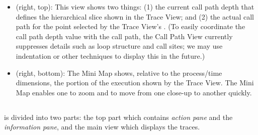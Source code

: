 \begin{itemize}
\item \textbf{\callview} (right, top):
  This view shows two things: (1) the current call path depth that defines the hierarchical slice shown in the Trace View; and (2) the actual call path for the point selected by the Trace View's \crosshair{}.
  (To easily coordinate the call path depth value with the call path, the Call Path View currently suppresses details such as loop structure and call sites; we may use indentation or other techniques to display this in the future.)

\item \textbf{\miniview} (right, bottom):
  The Mini Map shows, relative to the process/time dimensions, the portion of the execution shown by the Trace View.
  The Mini Map enables one to zoom and to move from one close-up to another quickly.

\end{itemize}


\subsection{\traceview}
\label{sec:traceview}

\traceview{} is divided into two parts: the top part which contains \emph{action pane} and the \emph{information pane}, and the main view which displays the traces. 

